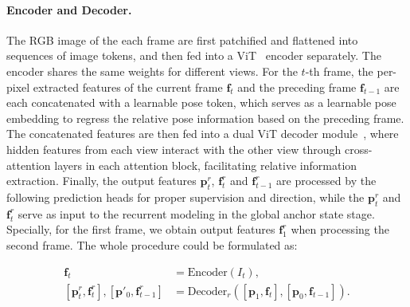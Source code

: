 \paragraph{Encoder and Decoder.}
The RGB image of the each frame are first patchified and flattened into sequences of image tokens, and then fed into a ViT~\cite{dosovitskiy2020image} encoder separately. The encoder shares the same weights for different views. For the $t$-th frame, the per-pixel extracted features of the current frame $\mathbf{f}_t$ and the preceding frame $\mathbf{f}_{t-1}$ are each concatenated with a learnable pose token, which serves as a learnable pose embedding to regress the relative pose information based on the preceding frame. The concatenated features are then fed into a dual ViT decoder module~\cite{wang2024dust3r, leroy2024grounding}, where hidden features from each view interact with the other view through cross-attention layers in each attention block, facilitating relative information extraction. Finally, the output features $\mathbf{p}^r_t$, $\mathbf{f}^r_t$ and $\mathbf{f}^r_{t-1}$ are processed by the following prediction heads for proper supervision and direction, while the $\mathbf{p}^r_t$ and $\mathbf{f}^r_t$ serve as input to the recurrent modeling in the global anchor state stage. Specially, for the first frame, we obtain output features $\mathbf{f}^r_1$ when processing the second frame. The whole procedure could be formulated as:

\begin{align}
    \mathbf{f}_t &= \text{Encoder}(I_t), \\
     [\mathbf{p}^{r}_t,\mathbf{f}^{r}_t], [\mathbf{p}'_0,\mathbf{f}^{r}_{t-1}]&= \text{Decoder}_r([\mathbf{p}_1, \mathbf{f}_t],[\mathbf{p}_0,\mathbf{f}_{t-1}]).
\end{align}




